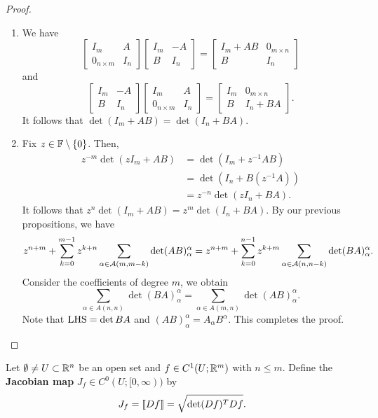 \documentclass[a4paper]{article}
\begin{document}
\begin{proof}
\begin{enumerate}
\item We have
\[
\begin{bmatrix}
  I_m & A \\
  0_{n \times m} & I_n
\end{bmatrix}
\begin{bmatrix}
  I_m & - A \\
  B & I_n
\end{bmatrix}
= \begin{bmatrix}
  I_m + AB & 0_{m \times n} \\
  B & I_n
\end{bmatrix}
\]
and
\[
\begin{bmatrix}
  I_m & -A \\
  B & I_n
\end{bmatrix}
\begin{bmatrix}
  I_m & A \\
  0_{n \times m} & I_n
\end{bmatrix}
= \begin{bmatrix}
  I_m & 0_{m \times n} \\
  B & I_n + BA
\end{bmatrix}.
\]
It follows that $\det(I_m + AB) = \det(I_n + BA)$.

\item Fix $z \in \mathbb{F} \setminus \left\{ 0 \right\}$.
Then,
\[
\begin{aligned}
  z^{-m} \det(z I_m + AB)
  &= \det(I_m + z^{-1} AB)  \\
  &= \det(I_n + B (z^{-1} A)) \\
  &= z^{-n} \det(z I_n + BA).
\end{aligned}
\]
It follows that $z^n \det(I_m + AB) =
z^m \det(I_n + BA)$. By our previous propositions,
we have
\[
z^{n+m} + \sum_{k=0}^{m-1}
z^{k+n} \sum_{\alpha \in \mathcal{A}(m, m-k)} \det(AB)_\alpha^\alpha
= z^{n + m} + \sum_{k=0}^{n-1} z^{k+m}
\sum_{\alpha \in \mathcal{A}(n, n - k)} \det (BA)_\alpha^\alpha.
\]
Consider the coefficients of degree $m$, we obtain
\[
\sum_{\alpha \in A(n, n)} \det(BA)_\alpha^\alpha
= \sum_{\alpha \in A(m, n)} \det(AB)_\alpha^\alpha.
\]
Note that $\operatorname{LHS} = \det BA$ and $(AB)_\alpha^\alpha =
A_\alpha B^\alpha$. This completes the proof.
\end{enumerate}
\end{proof}

\begin{defi}
Let $\emptyset \neq U \subset \mathbb{R}^n$ be an open set and
$f \in C^1 (U; \mathbb{R}^m)$ with $n \leq m$. Define the
\textbf{Jacobian map} $J_f \in C^0 (U; [0, \infty))$
by
\[
J_f = \left\llbracket Df \right\rrbracket = \sqrt{\det (Df)^T Df}.
\]
\end{defi}
\end{document}
